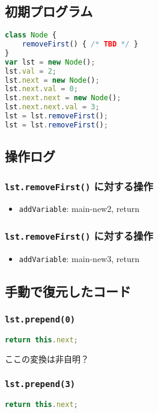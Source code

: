 \documentclass{article}
\begin{document}
\subsection{初期プログラム}

\begin{lstlisting}[language=JavaScript]
class Node {
    removeFirst() { /* TBD */ }
}
var lst = new Node(); 
lst.val = 2;
lst.next = new Node();
lst.next.val = 0;
lst.next.next = new Node();
lst.next.next.val = 3;
lst = lst.removeFirst();
lst = lst.removeFirst();
\end{lstlisting}

\subsection{操作ログ}

\subsubsection{\texttt{lst.removeFirst()} に対する操作}
\begin{itemize}
  \item \texttt{addVariable}: main-new2, return
\end{itemize}

\subsubsection{\texttt{lst.removeFirst()} に対する操作}
\begin{itemize}
  \item \texttt{addVariable}: main-new3, return
\end{itemize}

\subsection{手動で復元したコード}

\subsubsection{\texttt{lst.prepend(0)}}
\begin{lstlisting}[language=JavaScript]
return this.next;
\end{lstlisting}
ここの変換は非自明？


\subsubsection{\texttt{lst.prepend(3)}}
\begin{lstlisting}[language=JavaScript]
return this.next;
\end{lstlisting}
\end{document}
